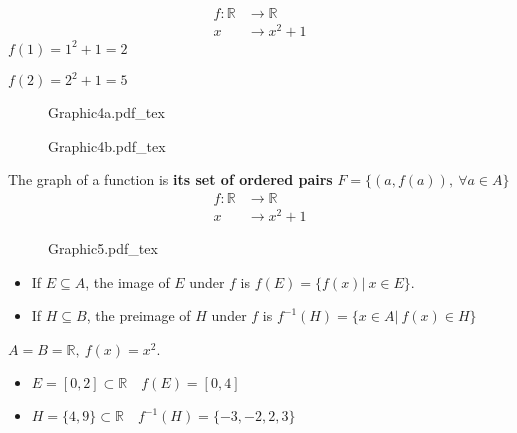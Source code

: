 \documentclass[12pt, a4paper]{book}
\newcommand{\incfig}[1]{%
\def\svgscale{1}
{#1.pdf_tex}
}
\begin{document}
\begin{exmp}
  \begin{align*}
    f:\mathbb{R} &\longrightarrow \mathbb{R} \\
    x &\longrightarrow x^2+1
  \end{align*}
  $f(1) = 1^2+1 = 2$

  $f(2) = 2^2+1 = 5$

  \begin{figure}[H]
    \centering
    \incfig{Graphic4a}
  \end{figure}

  \begin{figure}[H]
    \centering
    \incfig{Graphic4b}
  \end{figure}
  
\end{exmp}

\begin{defn}
  The graph of a function is \textbf{its set of ordered pairs} \boldmath $F=\{(a,f(a)),\ \forall a\in A\}$
  \begin{align*}
    f:\mathbb{R} &\longrightarrow \mathbb{R} \\
    x &\longrightarrow x^2+1
  \end{align*}
  \unboldmath

\end{defn}

\begin{figure}[H]
  \centering
  \incfig{Graphic5}
\end{figure}

\begin{defn}
  \begin{itemize}
    \item If $E \subseteq A$, the image of $E$ under $f$ is $f(E) = \{f(x)\vert\ x\in E\}$.
    \item If $H \subseteq B$, the preimage of $H$ under $f$ is $f^{-1}(H) = \{x\in A\vert\ f(x)\in H\}$
  \end{itemize}
\end{defn}

\begin{exmp}
  $A=B=\mathbb{R},\ f(x) = x^2$.
  \begin{itemize}
    \item $E = [0,2] \subset \mathbb{R} \quad f(E) = [0,4]$
    \item $H = \{4,9\} \subset \mathbb{R} \quad f^{-1}(H) = \{-3,-2,2,3\}$
  \end{itemize}
\end{exmp}
\end{document}
